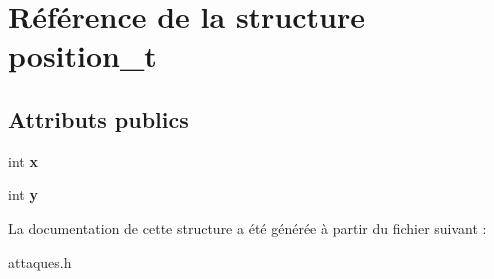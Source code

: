 \hypertarget{structposition__t}{}\section{Référence de la structure position\+\_\+t}
\label{structposition__t}
\subsection*{Attributs publics}
\begin{DoxyCompactItemize}
\item 
\mbox{\label{structposition__t_a6f81865a98e5c5ee33d6bf42dd4efe06}} 
int {\bfseries x}
\item 
\mbox{\label{structposition__t_acfe2d471728cfdd56a9f910e4e697a17}} 
int {\bfseries y}
\end{DoxyCompactItemize}


La documentation de cette structure a été générée à partir du fichier suivant \+:\begin{DoxyCompactItemize}
\item 
attaques.\+h\end{DoxyCompactItemize}
